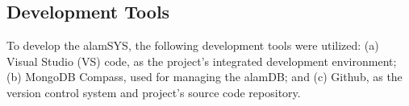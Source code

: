\subsection{Development Tools}
\label{subsec:dev_tools}

To develop the alamSYS, the following development tools were utilized: (a) Visual
Studio (VS) code, as the project's integrated development environment; (b) MongoDB Compass,
used for managing the alamDB; and (c) Github, as the version control system and
project's source code repository.